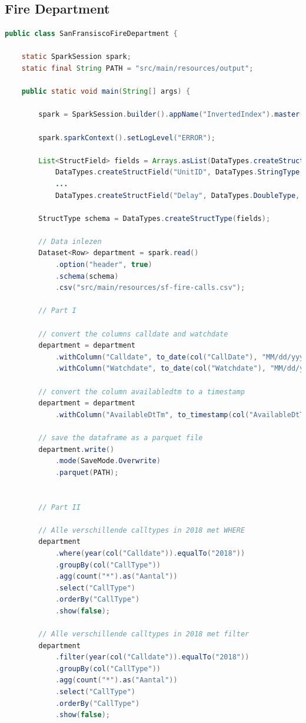 \documentclass[a4paper,10pt,twoside]{report}
\begin{document}
\subsection{Fire Department}
\begin{lstlisting}[language=Java]
public class SanFransiscoFireDepartment {
	
	static SparkSession spark;
	static final String PATH = "src/main/resources/output";
	
	public static void main(String[] args) {
		
		spark = SparkSession.builder().appName("InvertedIndex").master("local[*]").getOrCreate();
		
		spark.sparkContext().setLogLevel("ERROR");
		
		List<StructField> fields = Arrays.asList(DataTypes.createStructField("CallNumber", DataTypes.IntegerType, true),
			DataTypes.createStructField("UnitID", DataTypes.StringType, true),
			...
			DataTypes.createStructField("Delay", DataTypes.DoubleType, true));
		
		StructType schema = DataTypes.createStructType(fields);
		
		// Data inlezen
		Dataset<Row> department = spark.read()
			.option("header", true)
			.schema(schema)
			.csv("src/main/resources/sf-fire-calls.csv");
		
		// Part I
		
		// convert the columns calldate and watchdate
		department = department
			.withColumn("Calldate", to_date(col("CallDate"), "MM/dd/yyyy"))
			.withColumn("Watchdate", to_date(col("Watchdate"), "MM/dd/yyyy"));
		
		// convert the column availabledtm to a timestamp
		department = department
			.withColumn("AvailableDtTm", to_timestamp(col("AvailableDtTm"), "MM/dd/yyyy hh:mm:ss a"));
		
		// save the dataframe as a parquet file
		department.write()
			.mode(SaveMode.Overwrite)
			.parquet(PATH);
		
		
		// Part II
				
		// Alle verschillende calltypes in 2018 met WHERE
		department
			.where(year(col("Calldate")).equalTo("2018"))
			.groupBy(col("CallType"))
			.agg(count("*").as("Aantal"))
			.select("CallType")
			.orderBy("CallType")
			.show(false);
		
		// Alle verschillende calltypes in 2018 met filter
		department
			.filter(year(col("Calldate")).equalTo("2018"))
			.groupBy(col("CallType"))
			.agg(count("*").as("Aantal"))
			.select("CallType")
			.orderBy("CallType")
			.show(false);
\end{lstlisting}
\end{document}
